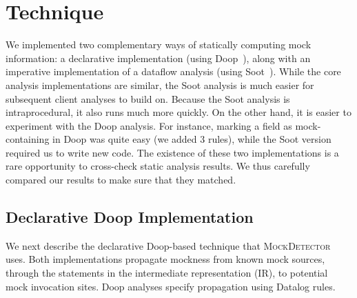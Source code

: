 \section{Technique}
\label{sec:technique}

We implemented two complementary ways of statically computing mock information: 
a declarative implementation (using Doop~\cite{bravenboer09:_stric_declar_specif_sophis_point_analy}), along with
an imperative implementation of a dataflow analysis (using Soot~\cite{Vallee-Rai:1999:SJB:781995.782008}). While the core analysis implementations are similar, the Soot analysis is much easier for subsequent client analyses to build on. Because the Soot analysis is intraprocedural, it also runs much more quickly. On the other hand, it is easier to experiment with the Doop analysis. For instance, marking a field as mock-containing in Doop was quite easy (we added 3 rules), while the Soot version required us to write new code.
The existence of these two implementations is a rare opportunity to cross-check static analysis results. We thus carefully compared our results to make sure that they matched.

\subsection{Declarative Doop Implementation}
\label{sec:dec-doop}
We next describe the declarative Doop-based technique that \textsc{MockDetector} uses. Both implementations propagate mockness from known mock sources, through the statements in the intermediate representation (IR), to potential mock invocation sites. Doop analyses specify propagation using Datalog rules. 

